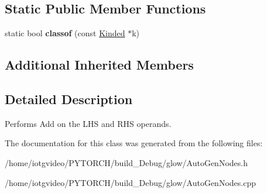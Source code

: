 \subsection*{Static Public Member Functions}
\begin{DoxyCompactItemize}
\item 
\mbox{\label{classglow_1_1_add_node_a3c81979939e38590278976d930f889b1}} 
static bool {\bfseries classof} (const \hyperlink{classglow_1_1_kinded}{Kinded} $\ast$k)
\end{DoxyCompactItemize}
\subsection*{Additional Inherited Members}


\subsection{Detailed Description}
Performs Add on the L\+HS and R\+HS operands. 

The documentation for this class was generated from the following files\+:\begin{DoxyCompactItemize}
\item 
/home/iotgvideo/\+P\+Y\+T\+O\+R\+C\+H/build\+\_\+\+Debug/glow/Auto\+Gen\+Nodes.\+h\item 
/home/iotgvideo/\+P\+Y\+T\+O\+R\+C\+H/build\+\_\+\+Debug/glow/Auto\+Gen\+Nodes.\+cpp\end{DoxyCompactItemize}
